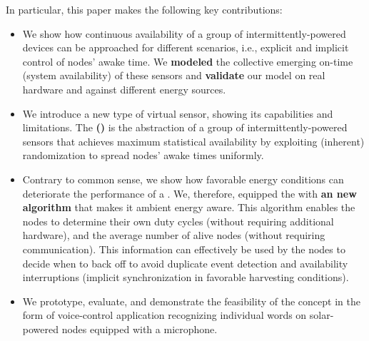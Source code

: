 
In particular, this paper makes the following key contributions:
\begin{itemize}
		\item We show how continuous availability of a group of intermittently-powered devices can be approached for different scenarios, i.e., explicit and implicit control of nodes' awake time. 
		We \textbf{modeled} the collective emerging on-time (system availability) of these sensors and \textbf{validate} our model on real hardware and against different energy sources. 
		\item We introduce a new type of virtual sensor, showing its capabilities and limitations. The \textbf{\fullsys (\sys)} is the abstraction of a group of intermittently-powered sensors that achieves maximum statistical availability by exploiting (inherent) randomization to spread nodes' awake times uniformly.
		\item Contrary to common sense, we show how favorable energy conditions can deteriorate the performance of a \sys. We, therefore, equipped the \sys with \textbf{an new algorithm} that makes it ambient energy aware.
		This algorithm enables the nodes to determine their own duty cycles (without requiring additional hardware),
		and the average number of alive nodes (without requiring communication). This information can effectively be used by the nodes to decide when to back off to avoid duplicate event detection and availability interruptions (implicit synchronization in favorable harvesting conditions).

		\item We prototype, evaluate, and demonstrate the feasibility of the \fullsys concept in the form of voice-control application recognizing individual words on solar-powered nodes equipped with a microphone.
\end{itemize}


